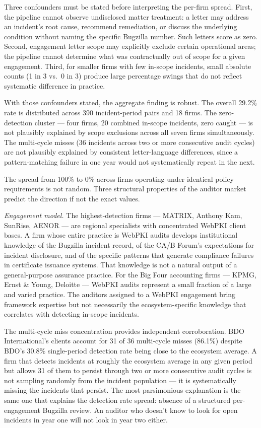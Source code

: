 \documentclass[10pt,twocolumn,letterpaper]{article}
\begin{document}
Three confounders must be stated before interpreting the per-firm spread.
First, the pipeline cannot observe undisclosed matter treatment: a letter
may address an incident's root cause, recommend remediation, or discuss
the underlying condition without naming the specific Bugzilla number.
Such letters score as zero. Second, engagement letter scope may explicitly
exclude certain operational areas; the pipeline cannot determine what was
contractually out of scope for a given engagement. Third, for smaller
firms with few in-scope incidents, small absolute counts (1 in 3 vs.\ 0
in 3) produce large percentage swings that do not reflect systematic
difference in practice.

With those confounders stated, the aggregate finding is robust. The
overall 29.2\% rate is distributed across 390 incident-period pairs and
18 firms. The zero-detection cluster --- four firms, 20 combined
in-scope incidents, zero caught --- is not plausibly explained by scope
exclusions across all seven firms simultaneously. The multi-cycle misses
(36 incidents across two or more consecutive audit cycles) are not
plausibly explained by consistent letter-language differences, since
a pattern-matching failure in one year would not systematically repeat
in the next.

The spread from 100\% to 0\% across firms operating under identical
policy requirements is not random. Three structural properties of the
auditor market predict the direction if not the exact values.

\textit{Engagement model.} The highest-detection firms --- MATRIX,
Anthony Kam, SunRise, AENOR --- are regional specialists with
concentrated WebPKI client bases. A firm whose entire practice is
WebPKI audits develops institutional knowledge of the Bugzilla
incident record, of the CA/B Forum's expectations for incident
disclosure, and of the specific patterns that generate compliance
failures in certificate issuance systems. That knowledge is not a
natural output of a general-purpose assurance practice. For the Big
Four accounting firms --- KPMG, Ernst \& Young, Deloitte --- WebPKI
audits represent a small fraction of a large and varied practice.
The auditors assigned to a WebPKI engagement bring framework expertise
but not necessarily the ecosystem-specific knowledge that correlates
with detecting in-scope incidents.

The multi-cycle miss concentration provides independent corroboration.
BDO International's clients account for 31 of 36 multi-cycle misses
(86.1\%) despite BDO's 30.8\% single-period detection rate being close
to the ecosystem average. A firm that detects incidents at roughly the
ecosystem average in any given period but allows 31 of them to persist
through two or more consecutive audit cycles is not sampling randomly
from the incident population --- it is systematically missing the incidents
that persist. The most parsimonious explanation is the same one that
explains the detection rate spread: absence of a structured per-engagement
Bugzilla review. An auditor who doesn't know to look for open incidents
in year one will not look in year two either.
\end{document}
